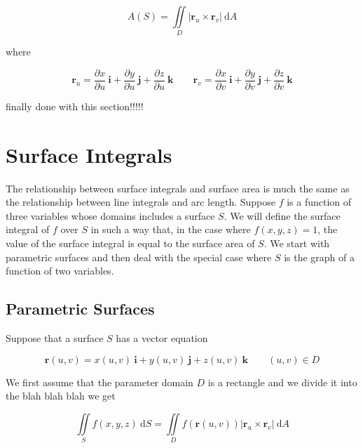 \documentclass{article}
\begin{document}
\begin{equation*}
    A(S) = \iint\limits_{D} \rvert \mathbf{r}_u \times \mathbf{r}_v \rvert \ \mathrm{d} A
\end{equation*}

where 

\begin{equation*}
    \mathbf{r}_u = \frac{\partial x}{\partial u} \ \mathbf{i} + \frac{\partial y}{\partial u} \ \mathbf{j} + \frac{\partial z}{ \partial u} \ \mathbf{k} \qquad \mathbf{r}_v = \frac{\partial x}{\partial v} \ \mathbf{i} + \frac{\partial y}{\partial v} \ \mathbf{j} + \frac{\partial z}{ \partial v} \ \mathbf{k}
\end{equation*}

finally done with this section!!!!!



\newpage
\section{Surface Integrals}

The relationship between surface integrals and surface area is much the same as the relationship between line integrals and arc length. Suppose $f$ is a function of three variables whose domains includes a surface $S$. We will define the surface integral of $f$ over $S$ in such a way that, in the case where $f(x,y,z) = 1$, the value of the surface integral is equal to the surface area of $S$. We start with parametric surfaces and then deal with the special case where $S$ is the graph of a function of two variables.

\subsection{Parametric Surfaces}

Suppose that a surface $S$ has a vector equation 

\begin{equation*}
    \mathbf{r}(u,v) = x(u,v) \ \mathbf{i} + y(u,v) \ \mathbf{j} + z(u,v) \ \mathbf{k} \qquad (u,v) \in D
\end{equation*}

We first assume that the parameter domain $D$ is a rectangle and we divide it into the blah blah blah we get 

\begin{equation*}
    \iint\limits_{S} f(x,y,z) \ \mathrm{d}S = \iint\limits_{D} f(\mathbf{r}(u,v)) \rvert \mathbf{r}_u \times \mathbf{r}_v   \rvert \ \mathrm{d}A
\end{equation*}
\end{document}
